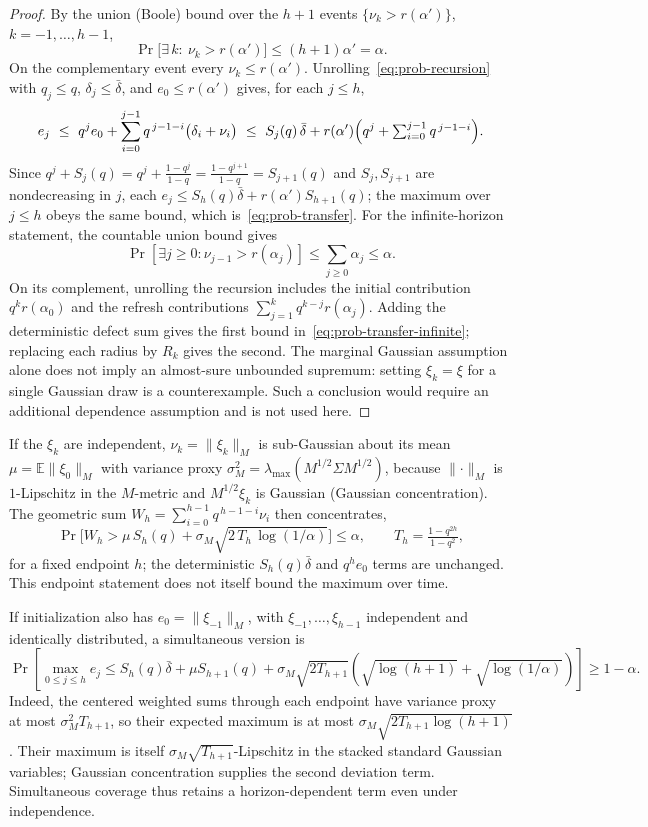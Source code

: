 \begin{proof}
By the union (Boole) bound over the $h+1$ events $\{\nu_k>r(\alpha')\}$, $k=-1,\dots,h-1$,
\[
  \Pr\!\bigl[\exists\,k:\ \nu_k>r(\alpha')\bigr]\le(h+1)\alpha'=\alpha.
\]
On the complementary event every $\nu_k\le r(\alpha')$. Unrolling~\eqref{eq:prob-recursion} with $q_j\le q$, $\delta_j\le\bar\delta$, and $e_0\le r(\alpha')$ gives, for each $j\le h$,
\[
  e_j\ \le\ q^{j}e_0+\sum_{i=0}^{j-1}q^{\,j-1-i}\bigl(\delta_i+\nu_i\bigr)
  \ \le\ S_j(q)\,\bar\delta+r(\alpha')\Bigl(q^{j}+\textstyle\sum_{i=0}^{j-1}q^{\,j-1-i}\Bigr).
\]
Since $q^{j}+S_j(q)=q^{j}+\tfrac{1-q^{j}}{1-q}=\tfrac{1-q^{j+1}}{1-q}=S_{j+1}(q)$ and $S_j,S_{j+1}$ are nondecreasing in $j$, each $e_j\le S_h(q)\bar\delta+r(\alpha')S_{h+1}(q)$; the maximum over $j\le h$ obeys the same bound, which is~\eqref{eq:prob-transfer}.
For the infinite-horizon statement, the countable union bound gives
\[
 \Pr\!\left[\exists j\ge0:\nu_{j-1}>r(\alpha_j)\right]
 \le\sum_{j\ge0}\alpha_j\le\alpha.
\]
On its complement, unrolling the recursion includes the initial contribution
$q^kr(\alpha_0)$ and the refresh contributions
$\sum_{j=1}^{k}q^{k-j}r(\alpha_j)$. Adding the deterministic defect sum gives
the first bound in~\eqref{eq:prob-transfer-infinite}; replacing each radius by
$R_k$ gives the second. The marginal Gaussian assumption alone does not imply
an almost-sure unbounded supremum: setting $\xi_k=\xi$ for a single Gaussian
draw is a counterexample. Such a conclusion would require an additional
dependence assumption and is not used here.
\end{proof}

\begin{remark}
\label{rem:prob-transfer-concentration}
If the $\xi_k$ are independent, $\nu_k=\lVert\xi_k\rVert_M$ is sub-Gaussian about its mean $\mu=\mathbb E\lVert\xi_0\rVert_M$ with variance proxy $\sigma_M^2=\lambda_{\max}(M^{1/2}\Sigma M^{1/2})$, because $\lVert\cdot\rVert_M$ is $1$-Lipschitz in the $M$-metric and $M^{1/2}\xi_k$ is Gaussian (Gaussian concentration). The geometric sum $W_h=\sum_{i=0}^{h-1}q^{\,h-1-i}\nu_i$ then concentrates,
\[
  \Pr\!\bigl[W_h>\mu\,S_h(q)+\sigma_M\sqrt{2\,T_h\,\log(1/\alpha)}\bigr]\le\alpha,
  \qquad T_h=\tfrac{1-q^{2h}}{1-q^{2}},
\]
for a fixed endpoint $h$; the deterministic $S_h(q)\bar\delta$ and $q^h e_0$ terms are unchanged. This endpoint statement does not itself bound the maximum over time.

If initialization also has $e_0=\|\xi_{-1}\|_M$, with
$\xi_{-1},\ldots,\xi_{h-1}$ independent and identically distributed, a simultaneous version is
\[
 \Pr\!\left[\max_{0\le j\le h}e_j\le
 S_h(q)\bar\delta+\mu S_{h+1}(q)
 +\sigma_M\sqrt{2T_{h+1}}
 \left(\sqrt{\log(h+1)}+\sqrt{\log(1/\alpha)}\right)\right]\ge1-\alpha.
\]
Indeed, the centered weighted sums through each endpoint have variance proxy
at most $\sigma_M^2T_{h+1}$, so their expected maximum is at most
$\sigma_M\sqrt{2T_{h+1}\log(h+1)}$. Their maximum is itself
$\sigma_M\sqrt{T_{h+1}}$-Lipschitz in the stacked standard Gaussian variables;
Gaussian concentration supplies the second deviation term. Simultaneous
coverage thus retains a horizon-dependent term even under independence.
\end{remark}

